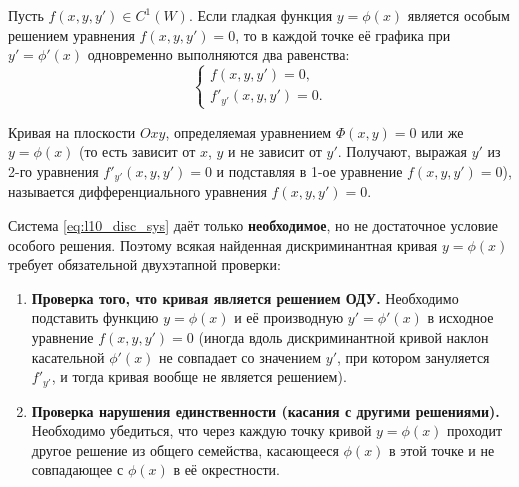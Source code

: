 \begin{theorem}
    Пусть $f(x, y, y') \in C^1(W)$. Если гладкая функция $y = \phi(x)$ является
    особым решением уравнения $f(x, y, y') = 0$, то в каждой точке её графика
    при $y' = \phi'(x)$ одновременно выполняются два равенства:
    \begin{equation} \label{eq:l10_disc_sys}
        \begin{cases}
            f(x, y, y') = 0, \\[1mm]
            f'_{y'}(x, y, y') = 0.
        \end{cases} \tag{4}
    \end{equation}
\end{theorem}

\begin{definition}
    Кривая на плоскости $Oxy$, определяемая уравнением $\Phi(x, y) = 0$ или же
    $y = \phi(x)$ (то есть зависит от $x$, $y$ и не зависит от $y'$. Получают,
    выражая $y'$ из 2-го уравнения $f'_{y'}(x, y, y') = 0$ и подставляя
    в 1-ое уравнение $f(x, y, y') = 0$),
    называется  дифференциального
    уравнения $f(x, y, y') = 0$.
\end{definition}

\begin{remark}
    Система \eqref{eq:l10_disc_sys} даёт только \textbf{необходимое}, но не
    достаточное условие особого решения. Поэтому всякая найденная
    дискриминантная кривая $y = \phi(x)$ требует обязательной двухэтапной
    проверки:
    \begin{enumerate}
        \item \textbf{Проверка того, что кривая является решением ОДУ.}
        Необходимо подставить функцию $y = \phi(x)$ и её производную
        $y' = \phi'(x)$ в исходное уравнение $f(x, y, y') = 0$ (иногда вдоль
        дискриминантной кривой наклон касательной $\phi'(x)$ не совпадает со
        значением $y'$, при котором зануляется $f'_{y'}$, и тогда кривая
        вообще не является решением).
        \item \textbf{Проверка нарушения единственности (касания с другими
        решениями).} Необходимо убедиться, что через каждую точку кривой
        $y = \phi(x)$ проходит другое решение из общего семейства, касающееся
        $\phi(x)$ в этой точке и не совпадающее с $\phi(x)$ в её окрестности.
    \end{enumerate}
\end{remark}

